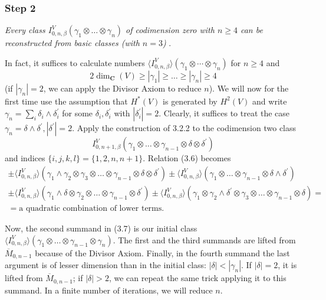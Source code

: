 \documentclass[reqno]{amsart}
\theoremstyle{definition}
\begin{document}
\medskip

\subsubsection{Step 2}
{\it
  Every class
  $I^V_{0,n,\beta}(\gamma_1 \otimes \dots \otimes\gamma_n)$
  of codimension zero with $n\ge 4$
  can be reconstructed from basic classes (with $n=3$)
}.

\smallskip

In fact, it suffices to calculate numbers
$\langle I^V_{0,n,\beta}\rangle (\gamma_1\otimes \cdots \otimes\gamma_n)$
for $n\ge 4$ and
\[
  2\dim_{\mathbf{C}}(V)\ge |\gamma_1|\ge\dots \ge |\gamma_n|\ge 4
\]
(if $|\gamma_n|=2$, we can apply the Divisor Axiom to reduce $n$).
We will now for the first time use the assumption that $H^*(V)$
is generated by $H^2(V)$ and write
$\gamma_n=\sum_i\delta_i\wedge \delta_i^{\prime}$
for some $\delta_i,\delta_i^{\prime}$ with
$|\delta_i^{\prime}|=2$.
Clearly, it suffices to treat the case
$\gamma_n=\delta\wedge\delta^{\prime}, |\delta^{\prime}|=2$.
Apply the construction of 3.2.2 to the codimension two class
\[
  I^V_{0,n+1,\beta}(\gamma_1\otimes \dots \otimes \gamma_{n-1}
  \otimes\delta\otimes\delta^{\prime})
\]
and indices $\{ i,j,k,l\} =\{ 1,2,n,n+1\}$.
Relation (3.6) becomes
\begin{equation}
  \begin{gathered}
    \pm\langle I^V_{0,n,\beta}\rangle
    (\gamma_1\wedge\gamma_2\otimes\gamma_3\otimes
    \dots\otimes\gamma_{n-1}\otimes\delta\otimes\delta^{\prime})
    \pm\langle I^V_{0,n,\beta}\rangle(\gamma_1\otimes\dots\otimes\gamma_{n-1}
    \otimes\delta\wedge\delta^{\prime}) \\
    \pm\langle I^V_{0,n,\beta}\rangle (\gamma_1\wedge\delta\otimes\gamma_2
    \otimes\dots\otimes\gamma_{n-1}\otimes\delta^{\prime})
    \pm \langle I^V_{0,n,\beta}\rangle (\gamma_1\otimes\gamma_2\wedge
      \delta^{\prime}\otimes\gamma_3\otimes\dots\otimes\gamma_{n-1}\otimes
    \delta) =
    \\
    = \text{a quadratic combination of lower terms}.
  \end{gathered}
  \tag{3.7}
\end{equation}

Now, the second summand in (3.7) is our initial class
$\langle I^V_{0,n,\beta}\rangle (\gamma_1\otimes\dots\otimes
\gamma_{n-1}\otimes\gamma_n)$. The first and the third
summands are lifted from $\overline{M}_{0,n-1}$ because of the
Divisor Axiom. Finally, in the fourth summand
the last argument is of lesser dimension than in the initial class:
$|\delta |<|\gamma_n|$. If $|\delta |=2$, it is lifted from
$\overline{M}_{0,n-1}$; if $|\delta |>2$, we can repeat the
same trick applying it to this summand. In a finite number of
iterations, we will reduce $n$.
\end{document}
